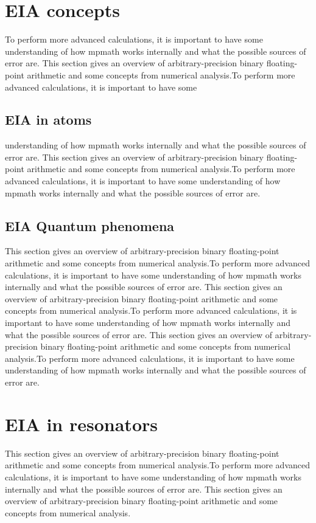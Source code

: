 \section{EIA concepts}
To perform more advanced calculations, it is important to have some understanding of how mpmath works internally and what the possible sources of error are. This section gives an overview of arbitrary-precision binary floating-point arithmetic and some concepts from numerical analysis.To perform more advanced calculations, it is important to have some
\subsection{EIA in atoms}
 understanding of how mpmath works internally and what the possible sources of error are. This section gives an overview of arbitrary-precision binary floating-point arithmetic and some concepts from numerical analysis.To perform more advanced calculations, it is important to have some understanding of how mpmath works internally and what the possible sources of error are. 
\subsection{EIA Quantum phenomena} 
 This section gives an overview of arbitrary-precision binary floating-point arithmetic and some concepts from numerical analysis.To perform more advanced calculations, it is important to have some understanding of how mpmath works internally and what the possible sources of error are. This section gives an overview of arbitrary-precision binary floating-point arithmetic and some concepts from numerical analysis.To perform more advanced calculations, it is important to have some understanding of how mpmath works internally and what the possible sources of error are. This section gives an overview of arbitrary-precision binary floating-point arithmetic and some concepts from numerical analysis.To perform more advanced calculations, it is important to have some understanding of how mpmath works internally and what the possible sources of error are.
\section{EIA in resonators} 
 
  This section gives an overview of arbitrary-precision binary floating-point arithmetic and some concepts from numerical analysis.To perform more advanced calculations, it is important to have some understanding of how mpmath works internally and what the possible sources of error are. This section gives an overview of arbitrary-precision binary floating-point arithmetic and some concepts from numerical analysis.
  
